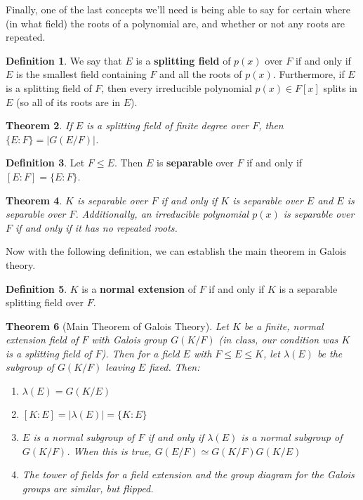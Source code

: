 \documentclass[11pt]{amsart}
\newtheorem{theorem}{Theorem}[section]
\theoremstyle{definition}
\newtheorem{definition}[theorem]{Definition}
\begin{document}
Finally, one of the last concepts we'll need is being able to say for certain where (in what field) the roots of a polynomial are, and whether
or not any roots are repeated.
\begin{definition}
	We say that $E$ is a \textbf{splitting field} of $p(x)$ over $F$ if and only if $E$ is the smallest field containing $F$ and all the roots of 
	$p(x)$. Furthermore, if $E$ is a splitting field of $F$, then every irreducible polynomial $p(x) \in F[x]$ splits in $E$ (so all of its
	roots are in $E$).
\end{definition}
\begin{theorem}
	If $E$ is a splitting field of finite degree over $F$, then $\{ E : F \} = | G(E/F) |$.
\end{theorem}
\begin{definition}
	Let $F \leq E$. Then $E$ is \textbf{separable} over $F$ if and only if $[ E : F ] = \{ E : F \}$.
\end{definition}
\begin{theorem}
	$K$ is separable over $F$ if and only if $K$ is separable over $E$ and $E$ is separable over $F$. Additionally, an irreducible polynomial
	$p(x)$ is separable over $F$ if and only if it has no repeated roots.
\end{theorem}
Now with the following definition, we can establish the main theorem in Galois theory.
\begin{definition}
	$K$ is a \textbf{normal extension} of $F$ if and only if $K$ is a separable splitting field over $F$.
\end{definition}
\begin{theorem}[Main Theorem of Galois Theory]
	Let $K$ be a finite, normal extension field of $F$ with Galois group $G(K/F)$ (in class, our condition was $K$ is a splitting field of $F$).
	Then for a field $E$ with $F \leq E \leq K$, let $\lambda(E)$ be the subgroup of $G(K/F)$ leaving $E$ fixed. Then:
	\begin{enumerate}
		\item{$\lambda(E) = G(K/E)$}
		\item{$[ K : E ] = | \lambda(E) | = \{ K : E \}$ }
		\item{$E$ is a normal subgroup of $F$ if and only if $\lambda(E)$ is a normal subgroup of $G(K/F)$. When this is true,
		$G(E/F) \simeq G(K/F)G(K/E)$ }
		\item{The tower of fields for a field extension and the group diagram for the Galois groups are similar, but flipped.}
	\end{enumerate}
\end{theorem}
\end{document}
